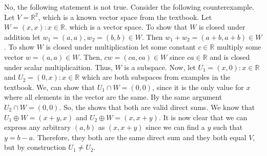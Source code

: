 \documentclass[10pt, twocolumn]{article}
\newcommand{\R}{\mathbb{R}}
\begin{document}
\begin{q}[Problem 23]
    No, the following statement is not true. 
    Consider the following counterexample. 
    Let $ V = \R^2 $, which is a known vector space from the textbook.  
    Let $ W = {(x, x): x \in \R }. $ which is a vector space. 
    To show that $ W $ is closed under addition let $ w_1 = (a, a), w_2 = (b, b) \in W $. 
    Then $ w_1 + w_2 = (a+b, a+b) \in W $. 
    To show $ W $ is closed under multiplication let some constant $ c \in \R $ multiply some vector $ w = (a, a) \in W $. 
    Then, $ cw = (ca, ca) \in W $ since $ ca \in \R $ and is closed under scalar multiplicaition. 
    Thus, $ W $ is a subspace. 
    Now, let $ U_1 = {(x, 0) : x \in \R } $ and $ U_2 = {(0, x) : x \in \R } $ which are both subspaces from examples in the textbook.
    We, can show that $ U_1 \cap W = {(0, 0)} $, since it is the only value for $ x $ where all elements in the vector are the same. 
    By the same argument $ U_2 \cap W = {(0, 0)} $. 
    So, the shows that both are valid direct sums. 
    We know that $ U_1 \oplus W = (x+y, x) $ and $ U_2 \oplus W = (x, x+y) $. 
    It is now clear that we can express any arbitrary $ (a, b) $ as $ (x, x+y) $ since we can find a $ y $ such that $ y = b - a $. 
    Therefore, they both are the same direct sum and they both equal $ V $, but by construction $ U_1 \neq U_2 $. 
\end{q}
\end{document}
